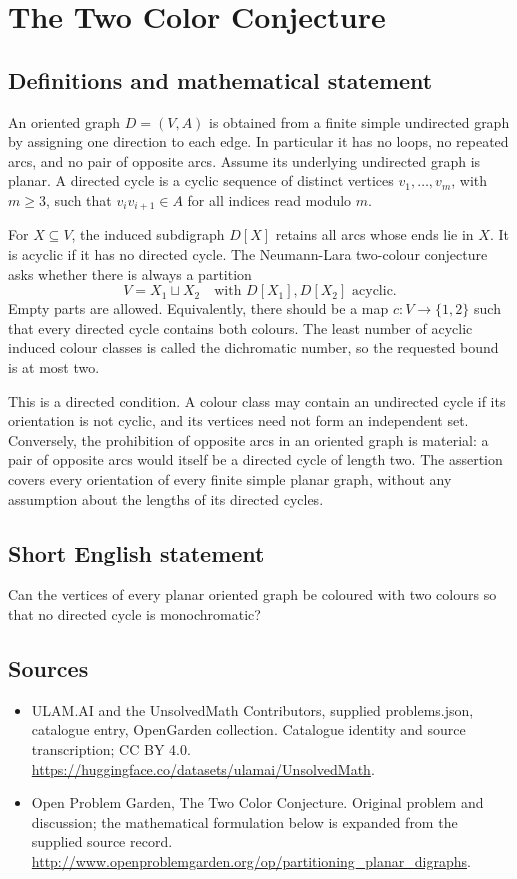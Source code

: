 \documentclass[11pt,a4paper]{article}
\begin{document}
\section*{The Two Color Conjecture}\label{statement}

\subsection{Definitions and mathematical statement}
An oriented graph $D=(V,A)$ is obtained from a finite simple undirected
graph by assigning one direction to each edge. In particular it has no
loops, no repeated arcs, and no pair of opposite arcs. Assume its
underlying undirected graph is planar. A directed cycle is a cyclic
sequence of distinct vertices $v_1,\ldots,v_m$, with $m\ge3$, such that
$v_i v_{i+1}\in A$ for all indices read modulo $m$.

For $X\subseteq V$, the induced subdigraph $D[X]$ retains all arcs whose
ends lie in $X$. It is acyclic if it has no directed cycle. The
Neumann-Lara two-colour conjecture asks whether there is always a
partition
\[
                  V=X_1\sqcup X_2
                  \quad\text{with }D[X_1],D[X_2]\text{ acyclic}.
\]
Empty parts are allowed. Equivalently, there should be a map
$c:V\to\{1,2\}$ such that every directed cycle contains both colours.
The least number of acyclic induced colour classes is called the
dichromatic number, so the requested bound is at most two.

This is a directed condition. A colour class may contain an undirected
cycle if its orientation is not cyclic, and its vertices need not form
an independent set. Conversely, the prohibition of opposite arcs in an
oriented graph is material: a pair of opposite arcs would itself be a
directed cycle of length two. The assertion covers every orientation of
every finite simple planar graph, without any assumption about the
lengths of its directed cycles.
\subsection{Short English statement}
Can the vertices of every planar oriented graph be coloured with two colours so that no directed cycle is monochromatic?
\subsection{Sources}
\begin{itemize}
\item[S1] ULAM.AI and the UnsolvedMath Contributors, supplied problems.json, catalogue entry, OpenGarden collection. Catalogue identity and source transcription; CC BY 4.0.
\url{https://huggingface.co/datasets/ulamai/UnsolvedMath}.
\item[S2] Open Problem Garden, The Two Color Conjecture. Original problem and discussion; the mathematical formulation below is expanded from the supplied source record.
\url{http://www.openproblemgarden.org/op/partitioning_planar_digraphs}.
\end{itemize}
\end{document}
